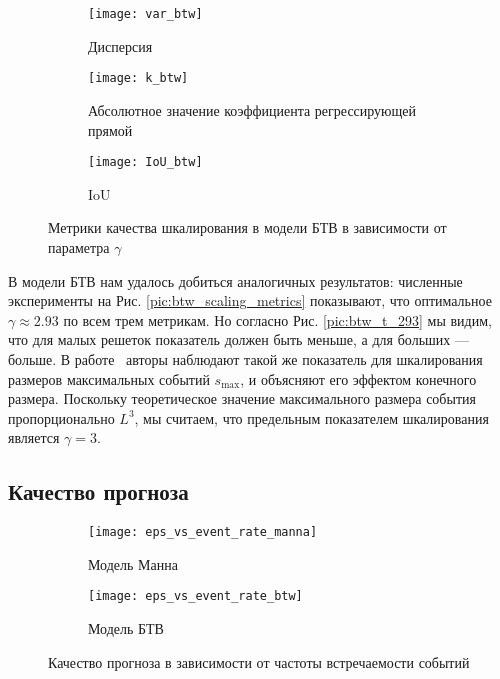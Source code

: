 \begin{figure}[h]
	\centering
	\centering
	\hspace{-25mm}
	\begin{subfigure}[t]{0.27\textwidth}
		\centering
		\texttt{[image: var\_btw]}
		\caption{Дисперсия}
	\end{subfigure}
	\hspace{10mm}
	\begin{subfigure}[t]{0.27\textwidth}
		\centering
		\texttt{[image: k\_btw]}
		\caption{Абсолютное значение коэффициента регрессирующей прямой}
	\end{subfigure}
	\hspace{10mm}
	\begin{subfigure}[t]{0.27\textwidth}
		\centering
		\texttt{[image: IoU\_btw]}
		\caption{IoU}
	\end{subfigure}
	\caption{Метрики качества шкалирования в модели БТВ в зависимости от параметра $\gamma$}\label{pic:btw_scaling_metrics}
\end{figure}

В модели БТВ нам удалось добиться аналогичных результатов: численные эксперименты на Рис. \eqref{pic:btw_scaling_metrics} показывают, что оптимальное $\gamma \approx 2.93$ по всем трем метрикам. Но согласно Рис. \eqref{pic:btw_t_293} мы видим, что для малых решеток показатель должен быть меньше, а для больших --- больше. В работе~\cite{Garber2009} авторы наблюдают такой же показатель для шкалирования размеров максимальных событий $s_{\max}$, и объясняют его эффектом конечного размера. Поскольку теоретическое значение максимального размера события пропорционально $L^3$, мы считаем, что предельным показателем шкалирования является $\gamma=3$.

\subsection{Качество прогноза}

\begin{figure}[h]
	\centering
	\begin{subfigure}[t]{0.45\textwidth}
		\centering
		\texttt{[image: eps\_vs\_event\_rate\_manna]}
		\caption{Модель Манна}
		\label{pic:event_rate_manna}
	\end{subfigure}
	\begin{subfigure}[t]{0.45\textwidth}
		\centering
		\texttt{[image: eps\_vs\_event\_rate\_btw]}
		\caption{Модель БТВ}
		\label{pic:event_rate_btw}
	\end{subfigure}
	\caption{Качество прогноза в зависимости от частоты встречаемости событий}\label{pic:event_rate}
\end{figure}

